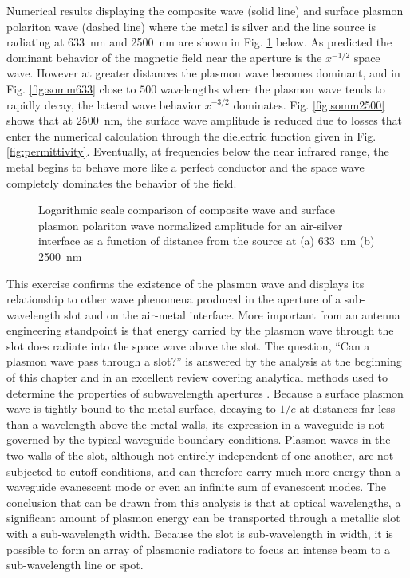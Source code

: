 \documentclass[11pt]{article}
\begin{document}
Numerical results displaying the composite wave (solid line) and surface plasmon polariton wave (dashed line) where the metal is silver and the line source is radiating at \SI{633}{\nano\metre} and \SI{2500}{\nano\metre} are shown in Fig. \ref{fig:sommerfeld} below. As predicted the dominant behavior of the magnetic field near the aperture is the $x^{-1/2}$ space wave. However at greater distances the plasmon wave becomes dominant, and in Fig. \ref{fig:somm633} close to $500$ wavelengths where the plasmon wave tends to rapidly decay, the lateral wave behavior $x^{-3/2}$ dominates. Fig. \ref{fig:somm2500} shows that at \SI{2500}{\nano\metre}, the surface wave amplitude is reduced due to losses that enter the numerical calculation through the dielectric function given in Fig. \ref{fig:permittivity}. Eventually, at frequencies below the near infrared range, the metal begins to behave more like a perfect conductor and the space wave completely dominates the behavior of the field.
%
\begin{figure}[t!]
  \center
   \hfil
  \caption{Logarithmic scale comparison of composite wave and surface plasmon polariton wave normalized amplitude for an air-silver interface as a function of distance from the source at (a) \SI{633}{\nano\metre} (b) \SI{2500}{\nano\metre}}
  \label{fig:sommerfeld}
\end{figure}
%
This exercise confirms the existence of the plasmon wave and displays its relationship to other wave phenomena produced in the aperture of a sub-wavelength slot and on the air-metal interface. More important from an antenna engineering standpoint is that energy carried by the plasmon wave through the slot does radiate into the space wave above the slot. The question, ``Can a plasmon wave pass through a slot?'' is answered by the analysis at the beginning of this chapter and in an excellent review covering analytical methods used to determine the properties of subwavelength apertures \cite{Garcia-Vidal2010}. Because a surface plasmon wave is tightly bound to the metal surface, decaying to $1/e$ at distances far less than a wavelength above the metal walls, its expression in a waveguide is not governed by the typical waveguide boundary conditions. Plasmon waves in the two walls of the slot, although not entirely independent of one another, are not subjected to cutoff conditions, and can therefore carry much more energy than a waveguide evanescent mode or even an infinite sum of evanescent modes. The conclusion that can be drawn from this analysis is that at optical wavelengths, a significant amount of plasmon energy can be transported through a metallic slot with a sub-wavelength width. Because the slot is sub-wavelength in width, it is possible to form an array of plasmonic radiators to focus an intense beam to a sub-wavelength line or spot.
\end{document}
